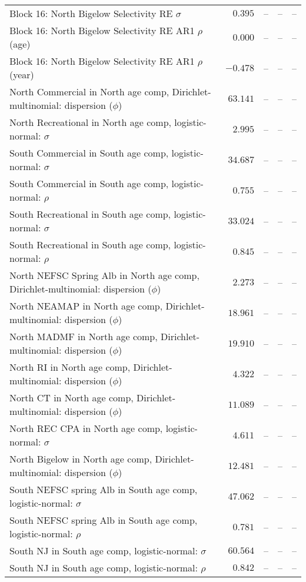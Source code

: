 \documentclass[
]{article}
\begin{document}
\begin{landscape}
\begin{longtable}[t]{lrrrr}
Block 16: North Bigelow Selectivity RE $\sigma$ & $0.395$ & -- & -- & --\\
Block 16: North Bigelow Selectivity RE AR1 $\rho$ (age) & $0.000$ & -- & -- & --\\
\addlinespace
Block 16: North Bigelow Selectivity RE AR1 $\rho$ (year) & $-0.478$ & -- & -- & --\\
North Commercial in North age comp, Dirichlet-multinomial: dispersion ($\phi$) & $63.141$ & -- & -- & --\\
North Recreational in North age comp, logistic-normal: $\sigma$ & $2.995$ & -- & -- & --\\
South Commercial in South age comp, logistic-normal: $\sigma$ & $34.687$ & -- & -- & --\\
South Commercial in South age comp, logistic-normal: $\rho$ & $0.755$ & -- & -- & --\\
\addlinespace
South Recreational in South age comp, logistic-normal: $\sigma$ & $33.024$ & -- & -- & --\\
South Recreational in South age comp, logistic-normal: $\rho$ & $0.845$ & -- & -- & --\\
North NEFSC Spring Alb in North age comp, Dirichlet-multinomial: dispersion ($\phi$) & $2.273$ & -- & -- & --\\
North NEAMAP in North age comp, Dirichlet-multinomial: dispersion ($\phi$) & $18.961$ & -- & -- & --\\
North MADMF in North age comp, Dirichlet-multinomial: dispersion ($\phi$) & $19.910$ & -- & -- & --\\
\addlinespace
North RI in North age comp, Dirichlet-multinomial: dispersion ($\phi$) & $4.322$ & -- & -- & --\\
North CT in North age comp, Dirichlet-multinomial: dispersion ($\phi$) & $11.089$ & -- & -- & --\\
North REC CPA in North age comp, logistic-normal: $\sigma$ & $4.611$ & -- & -- & --\\
North Bigelow in North age comp, Dirichlet-multinomial: dispersion ($\phi$) & $12.481$ & -- & -- & --\\
South NEFSC spring Alb in South age comp, logistic-normal: $\sigma$ & $47.062$ & -- & -- & --\\
\addlinespace
South NEFSC spring Alb in South age comp, logistic-normal: $\rho$ & $0.781$ & -- & -- & --\\
South NJ in South age comp, logistic-normal: $\sigma$ & $60.564$ & -- & -- & --\\
South NJ in South age comp, logistic-normal: $\rho$ & $0.842$ & -- & -- & --\\

\end{longtable}
\end{landscape}
\end{document}
